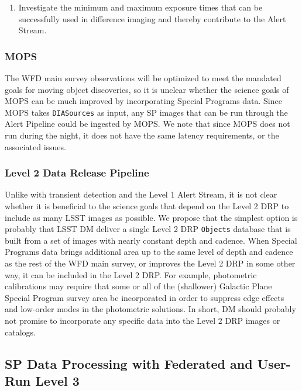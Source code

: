 \documentclass[DM,lsstdraft,toc]{lsstdoc}
\begin{document}
\begin{enumerate}[topsep=-10pt,label= \textbf{Concern \Roman*.}] \item \label{C1} Investigate the minimum and maximum exposure times that can be successfully used in difference imaging and thereby contribute to the Alert Stream. \end{enumerate}

\subsubsection{MOPS}\label{ssec:dmdocs_SPinWFD_MOPS}

The WFD main survey observations will be optimized to meet the mandated goals for moving object discoveries, so it is unclear whether the science goals of MOPS can be much improved by incorporating Special Programs data. Since MOPS takes {\tt DIASources} as input, any SP images that can be run through the Alert Pipeline could be ingested by MOPS. We note that since MOPS does not run during the night, it does not have the same latency requirements, or the associated issues.

\subsubsection{Level 2 Data Release Pipeline}\label{ssec:dmdocs_SPinWFD_L2}

Unlike with transient detection and the Level 1 Alert Stream, it is not clear whether it is beneficial to the science goals that depend on the Level 2 DRP to include as many LSST images as possible. We propose that the simplest option is probably that LSST DM deliver a single Level 2 DRP {\tt Objects} database that is built from a set of images with nearly constant depth and cadence. When Special Programs data brings additional area up to the same level of depth and cadence as the rest of the WFD main survey, or improves the Level 2 DRP in some other way, it can be included in the Level 2 DRP. For example, photometric calibrations may require that some or all of the (shallower) Galactic Plane Special Program survey area be incorporated in order to suppress edge effects and low-order modes in the photometric solutions. In short, DM should probably not promise to incorporate any specific data into the Level 2 DRP images or catalogs.

\subsection{SP Data Processing with Federated and User-Run Level 3}\label{ssec:dmdocs_L3}
\end{document}
